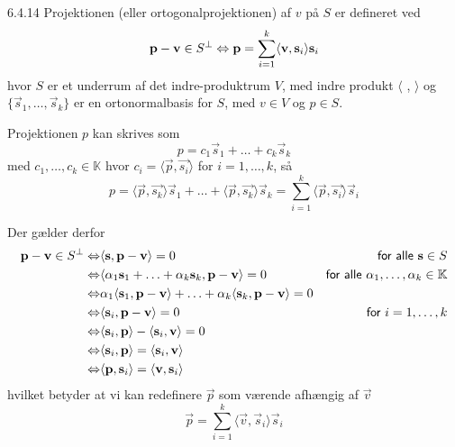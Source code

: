%
%

\begin{saetning}{6.4.14}
	Projektionen (eller ortogonalprojektionen) af $v$ på $S$ er defineret ved
	\[
		\mathbf{p} -\mathbf{v} \in S^\bot \Leftrightarrow \mathbf{p} = \sum^k_{i=1} \langle
		\mathbf{v}, \mathbf{s}_i \rangle \mathbf{s}_i
	\]
	hvor $S$ er et underrum af det indre-produktrum $V$, med indre produkt
	$\langle$ , $\rangle$ og $\{\vec{s}_1, \dotsc, \vec{s}_k\}$ er en
	ortonormalbasis for $S$, med $v \in V$ og $p \in S$.
\end{saetning}

\begin{bevis}
	Projektionen $p$ kan skrives som
	\[
		p=c_1 \vec{s}_1 + \dotso + c_k \vec{s}_k
	\]
	med $c_1, \dotsc, c_k \in \mathbb{K}$ hvor $c_i = \langle \vec{p},
	\vec{s_i} \rangle$ for $i=1,\dotsc,k$, så
	\[
		p=\langle \vec{p},	\vec{s_k} \rangle \vec{s}_1 + \dotso + \langle
		\vec{p}, \vec{s_k} \rangle \vec{s}_k = \sum^k_{i=1} \langle \vec{p},
		\vec{s_i} \rangle \vec{s}_i
	\]

	\noindent Der gælder derfor
	\begin{align*}
		\mathbf{p} - \mathbf{v} \in S^\bot \Leftrightarrow & \langle \mathbf{s}, \mathbf{p} - \mathbf{v} 
				\rangle = 0 & \textsf{for alle } \mathbf{s} \in S \\
			\Leftrightarrow & \langle \alpha_1 \mathbf{s}_1 + \dotsc + \alpha_k \mathbf{s}_k, 
				\mathbf{p} - \mathbf{v} \rangle = 0 & \textsf{for alle } \alpha_1, 
				\dotsc, \alpha_k \in \mathbb{K} \\
			\Leftrightarrow & \alpha_1 \langle \mathbf{s}_1, \mathbf{p} - \mathbf{v} \rangle +
				\dotsc + \alpha_k \langle \mathbf{s}_k, \mathbf{p} -\mathbf{v} \rangle 
				= 0 \\
			\Leftrightarrow & \langle \mathbf{s}_i, \mathbf{p} - \mathbf{v} \rangle = 0 & \textsf{for }
				i = 1, \dotsc, k \\
			\Leftrightarrow & \langle \mathbf{s}_i, \mathbf{p}\rangle - \langle \mathbf{s}_i, 
				\mathbf{v} \rangle = 0 \\
			\Leftrightarrow & \langle \mathbf{s}_i, \mathbf{p} \rangle = \langle
				\mathbf{s}_i, \mathbf{v} \rangle \\
			\Leftrightarrow & \langle \mathbf{p}, \mathbf{s}_i \rangle = \langle
				\mathbf{v}, \mathbf{s}_i \rangle
	\end{align*}
	hvilket betyder at vi kan redefinere $\vec{p}$ som værende afhængig af
	$\vec{v}$
	\[
		\vec{p} = \sum^k_{i=1} \langle \vec{v}, \vec{s}_i \rangle \vec{s}_i
	\]
\end{bevis}
